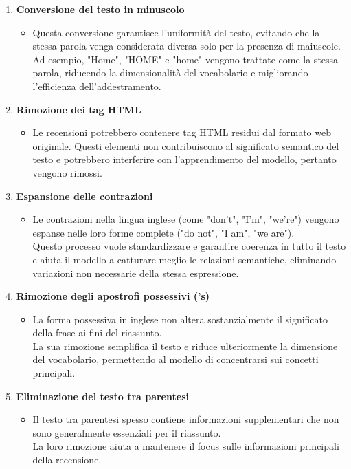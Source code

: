 \begin{enumerate}
    \item \textbf{Conversione del testo in minuscolo}
    \begin{itemize}
        \item Questa conversione garantisce l'uniformità del testo, evitando che la stessa parola venga considerata diversa solo per la presenza di maiuscole.\\Ad esempio, "Home", "HOME" e "home" vengono trattate come la stessa parola, riducendo la dimensionalità del vocabolario e migliorando l'efficienza dell'addestramento.
    \end{itemize}

    \item \textbf{Rimozione dei tag HTML}
    \begin{itemize}
        \item Le recensioni potrebbero contenere tag HTML residui dal formato web originale. 
        Questi elementi non contribuiscono al significato semantico del testo e potrebbero interferire con l'apprendimento del modello, pertanto vengono rimossi.
    \end{itemize}

    \item \textbf{Espansione delle contrazioni}
    \begin{itemize}
        \item Le contrazioni nella lingua inglese (come "don't", "I'm", "we're") vengono espanse nelle loro forme complete ("do not", "I am", "we are").\\
        Questo processo vuole standardizzare e garantire coerenza in tutto il testo e aiuta il modello a catturare meglio le relazioni semantiche, eliminando variazioni non necessarie della stessa espressione.
    \end{itemize}

    \item \textbf{Rimozione degli apostrofi possessivi ('s)}
    \begin{itemize}
        \item La forma possessiva in inglese non altera sostanzialmente il significato della frase ai fini del riassunto.\\ 
        La sua rimozione semplifica il testo e riduce ulteriormente la dimensione del vocabolario, permettendo al modello di concentrarsi sui concetti principali.
    \end{itemize}

    \item \textbf{Eliminazione del testo tra parentesi}
    \begin{itemize}
        \item Il testo tra parentesi spesso contiene informazioni supplementari che non sono generalmente essenziali per il riassunto.\\ 
        La loro rimozione aiuta a mantenere il focus sulle informazioni principali della recensione.
    \end{itemize}


\end{enumerate}
